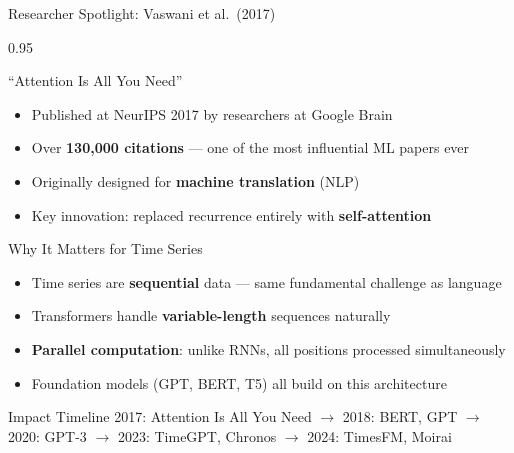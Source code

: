 \documentclass[9pt, aspectratio=169, t]{beamer}
\begin{document}
\begin{frame}{Researcher Spotlight: Vaswani et al.\ (2017)}
    \begin{cminipage}{0.95\textwidth}
    \vspace{-2mm}
    \begin{block}{``Attention Is All You Need''}
        {\small
        \begin{itemize}\setlength{\itemsep}{0pt}
            \item Published at NeurIPS 2017 by researchers at Google Brain
            \item Over \textbf{130{,}000 citations} --- one of the most influential ML papers ever
            \item Originally designed for \textbf{machine translation} (NLP)
            \item Key innovation: replaced recurrence entirely with \textbf{self-attention}
        \end{itemize}
        }
    \end{block}
    \vspace{-2mm}
    \begin{alertblock}{Why It Matters for Time Series}
        {\small
        \begin{itemize}\setlength{\itemsep}{0pt}
            \item Time series are \textbf{sequential} data --- same fundamental challenge as language
            \item Transformers handle \textbf{variable-length} sequences naturally
            \item \textbf{Parallel computation}: unlike RNNs, all positions processed simultaneously
            \item Foundation models (GPT, BERT, T5) all build on this architecture
        \end{itemize}
        }
    \end{alertblock}
    \vspace{-2mm}
    \begin{exampleblock}{Impact Timeline}
        {\small 2017: Attention Is All You Need $\to$ 2018: BERT, GPT $\to$ 2020: GPT-3 $\to$ 2023: TimeGPT, Chronos $\to$ 2024: TimesFM, Moirai}
    \end{exampleblock}
    \end{cminipage}
\end{frame}
\end{document}
